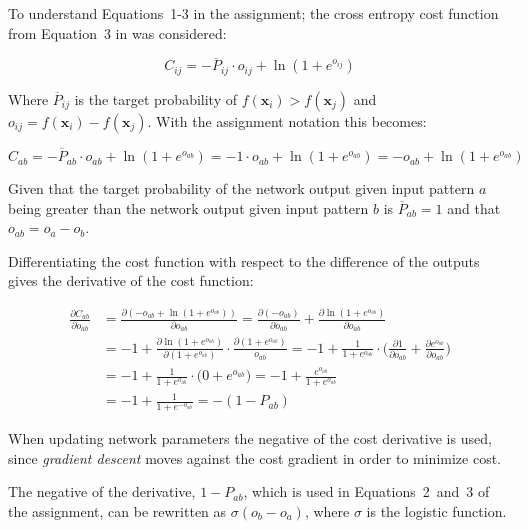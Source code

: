 To understand Equations~1-3 in the assignment; the cross entropy cost function from Equation~3 in \cite{burges2005learning} was considered:

\begin{equation}
C_{ij} = -\overline{P}_{ij} \cdot o_{ij} + \ln (1 + e^{o_{ij}})
\end{equation}

Where $\overline{P}_{ij}$ is the target probability of $f(\pmb{x}_i) > f(\pmb{x}_j)$ and $o_{ij} = f(\pmb{x}_i) - f(\pmb{x}_j)$. With the assignment notation this becomes:

\begin{equation}
C_{ab} = -\overline{P}_{ab} \cdot o_{ab} + \ln (1 + e^{o_{ab}}) = -1 \cdot o_{ab} + \ln (1 + e^{o_{ab}}) = -o_{ab} + \ln (1 + e^{o_{ab}})
\end{equation}

Given that the target probability of the network output given input pattern $a$ being greater than the network output given input pattern $b$ is $\overline{P}_{ab} = 1$ and that $o_{ab} = o_a - o_b$.

\setlength\parindent{17pt}

Differentiating the cost function with respect to the difference of the outputs gives the derivative of the cost function:

\begin{equation}
\begin{split}
\frac{\partial C_{ab}}{\partial o_{ab}} &= \frac{\partial (-o_{ab} + \ln (1 + e^{o_{ab}}))}{\partial o_{ab}}
= \frac{\partial (-o_{ab})}{\partial o_{ab}} + \frac{\partial \ln (1 + e^{o_{ab}})}{\partial o_{ab}}\\
&= -1 + \frac{\partial \ln (1 + e^{o_{ab}})}{\partial (1 + e^{o_{ab}})} \cdot \frac{\partial (1 + e^{o_{ab}})}{o_{ab}}
= -1 + \frac{1}{1 + e^{o_{ab}}} \cdot \Big(\frac{\partial 1}{\partial o_{ab}} + \frac{\partial e^{o_{ab}}}{\partial o_{ab}}\Big)\\
&= -1 + \frac{1}{1 + e^{o_{ab}}} \cdot \Big(0 + e^{o_{ab}}\Big)
= -1 + \frac{e^{o_{ab}}}{1 + e^{o_{ab}}}\\
&= -1 + \frac{1}{1 + e^{-o_{ab}}}
= -(1 - P_{ab})
\end{split}
\end{equation}

When updating network parameters the negative of the cost derivative is used, since \textit{gradient descent} moves against the cost gradient in order to minimize cost.

The negative of the derivative, $1 - P_{ab}$, which is used in Equations~2~and~3 of the assignment, can be rewritten as $\sigma (o_b - o_a)$, where $\sigma$ is the logistic function.

